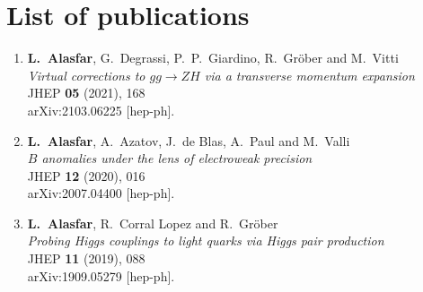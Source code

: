 
\chapter*{List of publications}
\begin{enumerate}
 \item \textbf{L.~Alasfar}, G.~Degrassi, P.~P.~Giardino, R.~Gr\"ober and M.~Vitti\\
 \textit{Virtual corrections to $gg\to ZH$ via a transverse momentum expansion}\\
 JHEP \textbf{05} (2021), 168\\ arXiv:2103.06225 [hep-ph].
\item \textbf{L.~Alasfar}, A.~Azatov, J.~de Blas, A.~Paul and M.~Valli\\
\textit{$B$ anomalies under the lens of electroweak precision}\\
JHEP \textbf{12} (2020), 016\\
arXiv:2007.04400 [hep-ph].
\item \textbf{L.~Alasfar}, R.~Corral Lopez and R.~Gr\"ober\\
\textit{Probing Higgs couplings to light quarks via Higgs pair production}\\
JHEP \textbf{11} (2019), 088\\
arXiv:1909.05279 [hep-ph].
\end{enumerate}%

%
